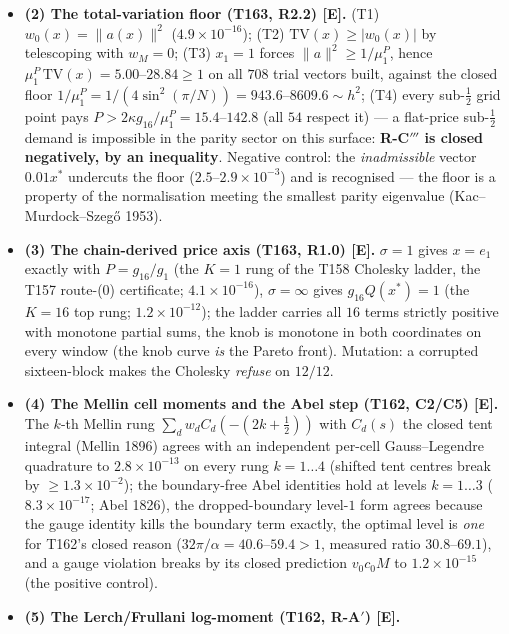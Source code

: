 \documentclass[11pt]{article}
\providecommand{\mE}{\textbf{[E]}}\providecommand{\mC}{\textbf{[C]}}
\begin{document}
\begin{itemize}[leftmargin=1.5em]
$\delta_{\mathrm{bnd}}<\tfrac12\iff P>2\kappa g_{16}\mathrm{TV}$ holds as an exact
equivalence at every point --- price and demand are two coordinates of \emph{one}
object. Mutation: the wrong constant moves the law by $6.5\times10^{-2}$--$3.4$.
\item \textbf{(2) The total-variation floor (T163, R2.2) \mE.} (T1)
$w_0(x)=\|a(x)\|^2$ ($4.9\times10^{-16}$); (T2) $\mathrm{TV}(x)\ge|w_0(x)|$ by
telescoping with $w_M=0$; (T3) $x_1=1$ forces $\|a\|^2\ge1/\mu^P_1$, hence
$\mu^P_1\,\mathrm{TV}(x)=5.00$--$28.84\ge1$ on all $708$ trial vectors built, against
the closed floor $1/\mu^P_1=1/(4\sin^2(\pi/N))=943.6$--$8609.6\sim h^2$; (T4) every
sub-$\tfrac12$ grid point pays $P>2\kappa g_{16}/\mu^P_1=15.4$--$142.8$ (all $54$
respect it) --- a flat-price sub-$\tfrac12$ demand is impossible in the parity sector
on this surface: \textbf{R-C$'''$ is closed negatively, by an inequality}. Negative
control: the \emph{inadmissible} vector $0.01x^*$ undercuts the floor
($2.5$--$2.9\times10^{-3}$) and is recognised --- the floor is a property of the
normalisation meeting the smallest parity eigenvalue (Kac--Murdock--Szeg\H{o} 1953).
\item \textbf{(3) The chain-derived price axis (T163, R1.0) \mE.} $\sigma=1$ gives
$x=e_1$ exactly with $P=g_{16}/g_1$ (the $K=1$ rung of the T158 Cholesky ladder, the
T157 route-(0) certificate; $4.1\times10^{-16}$), $\sigma=\infty$ gives
$g_{16}Q(x^*)=1$ (the $K=16$ top rung; $1.2\times10^{-12}$); the ladder carries all
$16$ terms strictly positive with monotone partial sums, the knob is monotone in both
coordinates on every window (the knob curve \emph{is} the Pareto front). Mutation: a
corrupted sixteen-block makes the Cholesky \emph{refuse} on $12/12$.
\item \textbf{(4) The Mellin cell moments and the Abel step (T162, C2/C5) \mE.} The
$k$-th Mellin rung $\sum_dw_dC_d(-(2k+\tfrac12))$ with $C_d(s)$ the closed tent
integral (Mellin 1896) agrees with an independent per-cell Gauss--Legendre quadrature
to $2.8\times10^{-13}$ on every rung $k=1\ldots4$ (shifted tent centres break by
$\ge1.3\times10^{-2}$); the boundary-free Abel identities hold at levels $k=1\ldots3$
($8.3\times10^{-17}$; Abel 1826), the dropped-boundary level-$1$ form agrees because
the gauge identity kills the boundary term exactly, the optimal level is \emph{one}
for T162's closed reason ($32\pi/\alpha=40.6$--$59.4>1$, measured ratio
$30.8$--$69.1$), and a gauge violation breaks by its closed prediction $v_0c_0M$ to
$1.2\times10^{-15}$ (the positive control).
\item \textbf{(5) The Lerch/Frullani log-moment (T162, R-A$'$) \mE.}

\end{itemize}
\end{document}
